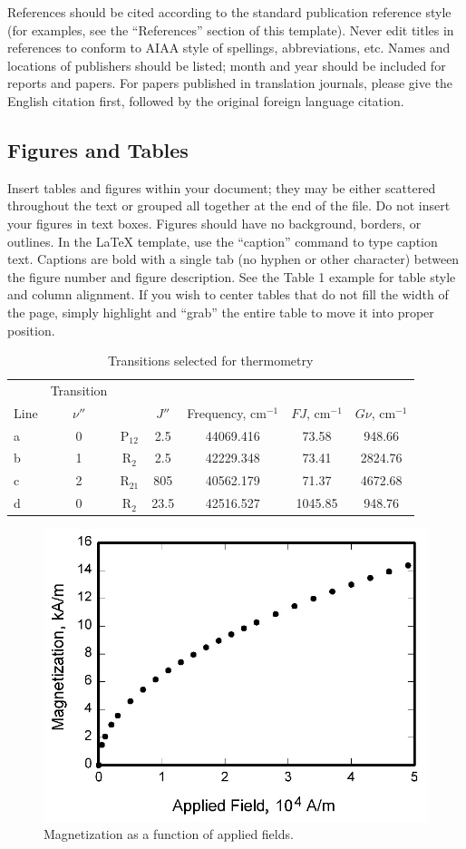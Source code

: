 \documentclass[journal]{new-aiaa}
\begin{document}
References should be cited according to the standard publication reference style (for examples, see the ``References'' section of this template). Never edit titles in references to conform to AIAA style of spellings, abbreviations, etc. Names and locations of publishers should be listed; month and year should be included for reports and papers. For papers published in translation journals, please give the English citation first, followed by the original foreign language citation.

\subsection{Figures and Tables}
Insert tables and figures within your document; they may be either scattered throughout the text or grouped all together at the end of the file. Do not insert your figures in text boxes. Figures should have no background, borders, or outlines. In the \LaTeX{} template, use the ``caption'' command to type caption text. Captions are bold with a single tab (no hyphen or other character) between the figure number and figure description. See the Table 1 example for table style and column alignment. If you wish to center tables that do not fill the width of the page, simply highlight and “grab” the entire table to move it into proper position.


\begin{table}[hbt!]
\caption{\label{tab:table1} Transitions selected for thermometry}
\centering
\begin{tabular}{lcccccc}
\hline
& Transition& & \multicolumn{2}{c}{}\\\cline{2-2}
Line& $\nu''$& & $J'' $& Frequency, cm$^{-1}$& $FJ$, cm$^{-1}$& $G\nu $, cm$^{-1}$\\\hline
a& 0& P$_{12}$& 2.5& 44069.416& 73.58& 948.66\\
b& 1& R$_{2}$& 2.5& 42229.348& 73.41& 2824.76\\
c& 2& R$_{21}$& 805& 40562.179& 71.37& 4672.68\\
d& 0& R$_{2}$& 23.5& 42516.527& 1045.85& 948.76\\
\hline
\end{tabular}
\end{table}


\begin{figure}[hbt!]
\centering
\includegraphics[width=.5\textwidth]{graph}
\caption{Magnetization as a function of applied fields.}
\end{figure}
\end{document}

